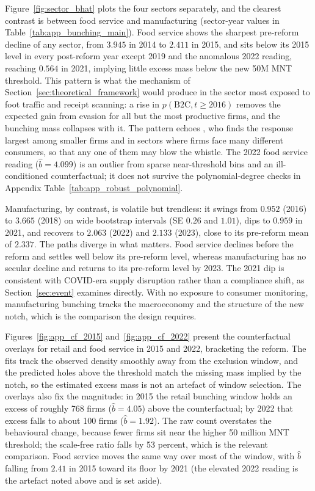 \documentclass[12pt,oneside,a4paper]{report}
\begin{document}
Figure~\ref{fig:sector_bhat} plots the four sectors separately, and the clearest contrast is between food service and manufacturing (sector-year values in Table~\ref{tab:app_bunching_main}). Food service shows the sharpest pre-reform decline of any sector, from $3.945$ in 2014 to $2.411$ in 2015, and sits below its 2015 level in every post-reform year except 2019 and the anomalous 2022 reading, reaching $0.564$ in 2021, implying little excess mass below the new 50M MNT threshold. This pattern is what the mechanism of Section~\ref{sec:theoretical_framework} would produce in the sector most exposed to foot traffic and receipt scanning: a rise in $p(\text{B2C}, t \geq 2016)$ removes the expected gain from evasion for all but the most productive firms, and the bunching mass collapses with it. The pattern echoes \textcite{naritomi2019consumers}, who finds the response largest among smaller firms and in sectors where firms face many different consumers, so that any one of them may blow the whistle. The 2022 food service reading ($\hat{b} = 4.099$) is an outlier from sparse near-threshold bins and an ill-conditioned counterfactual; it does not survive the polynomial-degree checks in Appendix Table~\ref{tab:app_robust_polynomial}.

Manufacturing, by contrast, is volatile but trendless: it swings from $0.952$ (2016) to $3.665$ (2018) on wide bootstrap intervals (SE $0.26$ and $1.01$), dips to $0.959$ in 2021, and recovers to $2.063$ (2022) and $2.133$ (2023), close to its pre-reform mean of $2.337$. The paths diverge in what matters. Food service declines before the reform and settles well below its pre-reform level, whereas manufacturing has no secular decline and returns to its pre-reform level by 2023. The 2021 dip is consistent with COVID-era supply disruption rather than a compliance shift, as Section~\ref{sec:event} examines directly. With no exposure to consumer monitoring, manufacturing bunching tracks the macroeconomy and the structure of the new notch, which is the comparison the design requires.

Figures~\ref{fig:app_cf_2015} and~\ref{fig:app_cf_2022} present the counterfactual overlays for retail and food service in 2015 and 2022, bracketing the reform. The fits track the observed density smoothly away from the exclusion window, and the predicted holes above the threshold match the missing mass implied by the notch, so the estimated excess mass is not an artefact of window selection. The overlays also fix the magnitude: in 2015 the retail bunching window holds an excess of roughly 768 firms ($\hat{b} = 4.05$) above the counterfactual; by 2022 that excess falls to about 100 firms ($\hat{b} = 1.92$). The raw count overstates the behavioural change, because fewer firms sit near the higher 50 million MNT threshold; the scale-free ratio falls by 53 percent, which is the relevant comparison. Food service moves the same way over most of the window, with $\hat{b}$ falling from $2.41$ in 2015 toward its floor by 2021 (the elevated 2022 reading is the artefact noted above and is set aside).
\end{document}
